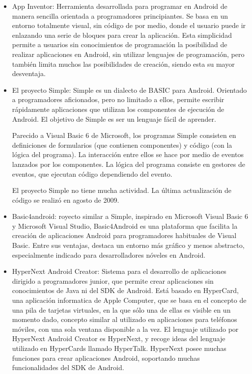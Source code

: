 \documentclass[
10pt, %
a4paper, %
oneside, %
headinclude,footinclude, %
BCOR5mm, %
]{scrartcl}
\begin{document}
\begin{itemize}
	\item App Inventor: Herramienta desarrollada para programar en Android de manera sencilla orientada a programadores principiantes. Se basa en un entorno totalmente visual, sin código de por medio, donde el usuario puede ir enlazando una serie de bloques para crear la aplicación. Esta simplicidad permite a usuarios sin conocimientos de programación la posibilidad de realizar aplicaciones en Android, sin utilizar lenguajes de programación, pero también limita muchos las posibilidades de creación, siendo esta su mayor desventaja.

	\item El proyecto Simple: Simple es un dialecto de BASIC para Android. Orientado a programadores aficionados, pero no limitado a ellos, permite escribir rápidamente aplicaciones que utilizan los componentes de ejecución de Android. El objetivo de Simple es ser un lenguaje fácil de aprender.

	Parecido a Visual Basic 6 de Microsoft, los programas Simple consisten en definiciones de formularios (que contienen componentes) y código (con la lógica del programa). La interacción entre ellos se hace por medio de eventos lanzados por los componentes. La lógica del programa consiste en gestores de eventos, que ejecutan código dependiendo del evento.

	El proyecto Simple no tiene mucha actividad. La última actualización de código se realizó en agosto de 2009.

	\item Basic4android: royecto similar a Simple, inspirado en Microsoft Visual Basic 6 y Microsoft Visual Studio, Basic4Android es una plataforma que facilita la creación de aplicaciones Android para programadores habituales de Visual Basic. Entre sus ventajas, destaca un entorno más gráfico y menos abstracto, especialmente indicado para desarrolladores nóveles en Android.

	\item HyperNext Android Creator: Sistema para el desarrollo de aplicaciones dirigido a programadores junior, que permite crear aplicaciones sin conocimientos de Java ni del SDK de Android. Está basado en HyperCard, una aplicación informatica de Apple Computer, que se basa en el concepto de una pila de tarjetas virtuales, en la que sólo una de ellas es visible en un momento dado, concepto similar al utilizado en aplicaciones para teléfonos móviles, con una sola ventana disponible a la vez. El lenguaje utilizado por HyperNext Android Creator es HyperNext, y recoge ideas del lenguaje utilizado en HyperCards llamado HyperTalk. HyperNext posee muchas funciones para crear aplicaciones Android, soportando muchas funcionalidades del SDK de Android.


\end{itemize}
\end{document}
